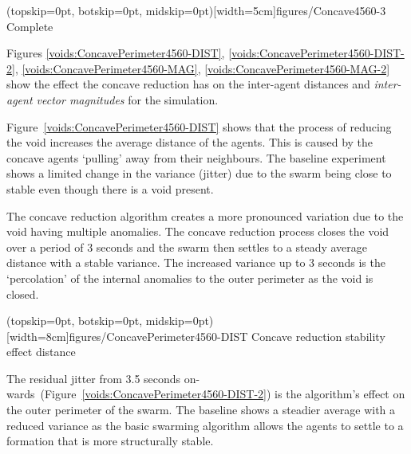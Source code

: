 \documentclass{ieeeaccess}
\begin{document}
\Figure[t!](topskip=0pt, botskip=0pt, midskip=0pt)[width=5cm]{figures/Concave4560-3}
{Complete\label{fig:VoidConcaveReduction3}}


Figures \ref{voids:ConcavePerimeter4560-DIST}, \ref{voids:ConcavePerimeter4560-DIST-2}, \ref{voids:ConcavePerimeter4560-MAG}, \ref{voids:ConcavePerimeter4560-MAG-2} show the effect the concave reduction has on the inter-agent distances and \textit{inter-agent vector magnitudes} for the simulation. 

Figure~\ref{voids:ConcavePerimeter4560-DIST} shows that the process of reducing the void increases the average distance of the agents. This is caused by the concave agents `pulling' away from their neighbours. The baseline experiment shows a limited change in the variance (jitter) due to the swarm being close to stable even though there is a void present. 

The concave reduction algorithm creates a more pronounced variation due to the void having multiple anomalies. The concave reduction process closes the void over a period of 3 seconds and the swarm then settles to a steady average distance with a stable variance. The increased variance up to 3 seconds is the `percolation' of the internal anomalies to the outer perimeter as the void is closed.

\Figure[t!](topskip=0pt, botskip=0pt, midskip=0pt)[width=8cm]{figures/ConcavePerimeter4560-DIST}
{Concave reduction stability effect distance\label{voids:ConcavePerimeter4560-DIST}}


The residual jitter from 3.5 seconds on-wards~(Figure~\ref{voids:ConcavePerimeter4560-DIST-2}) is the algorithm's effect on the outer perimeter of the swarm. The baseline shows a steadier average with a reduced variance as the basic swarming algorithm allows the agents to settle to a formation that is more structurally stable.
\end{document}
